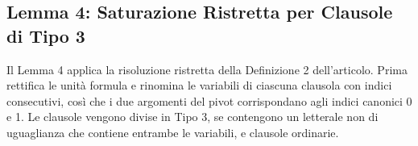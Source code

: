 
\newpage

\subsection{Lemma 4: Saturazione Ristretta per Clausole di Tipo 3}
\label{subsec:lemma4_impl}

Il Lemma 4 applica la risoluzione ristretta della Definizione 2 dell'articolo. Prima rettifica le unità formula e rinomina le variabili di ciascuna clausola con indici consecutivi, così che i due argomenti del pivot corrispondano agli indici canonici 0 e 1. Le clausole vengono divise in Tipo 3, se contengono un letterale non di uguaglianza che contiene entrambe le variabili, e clausole ordinarie.

